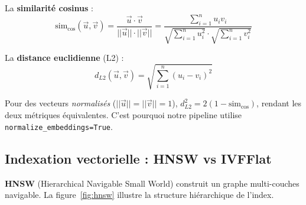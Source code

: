 \documentclass[12pt,a4paper]{article}
\begin{document}
La \textbf{similarit\'{e} cosinus} :
\begin{equation}
\text{sim}_{\cos}(\vec{u}, \vec{v}) = \frac{\vec{u} \cdot \vec{v}}{||\vec{u}|| \cdot ||\vec{v}||} = \frac{\sum_{i=1}^{n} u_i v_i}{\sqrt{\sum_{i=1}^{n} u_i^2} \cdot \sqrt{\sum_{i=1}^{n} v_i^2}}
\label{eq:cosine}
\end{equation}

La \textbf{distance euclidienne} (L2) :
\begin{equation}
d_{L2}(\vec{u}, \vec{v}) = \sqrt{\sum_{i=1}^{n}(u_i - v_i)^2}
\label{eq:l2}
\end{equation}

Pour des vecteurs \textit{normalis\'{e}s} ($||\vec{u}|| = ||\vec{v}|| = 1$), $d_{L2}^2 = 2(1 - \text{sim}_{\cos})$, rendant les deux m\'{e}triques \'{e}quivalentes. C'est pourquoi notre pipeline utilise \texttt{normalize\_embeddings=True}.

\subsection{Indexation vectorielle : HNSW vs IVFFlat}

\textbf{HNSW} (Hierarchical Navigable Small World) \cite{malkov2020hnsw} construit un graphe multi-couches navigable. La figure~\ref{fig:hnsw} illustre la structure hi\'{e}rarchique de l'index.
\end{document}
